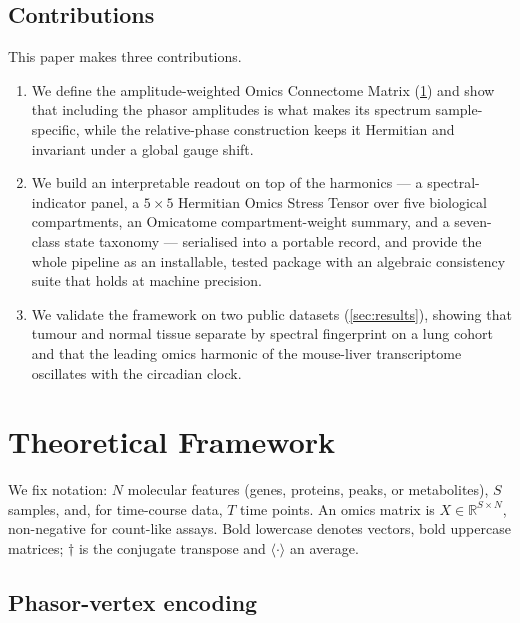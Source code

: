 \documentclass[preprint,12pt,amsmath,amssymb,superscriptaddress,floatfix]{revtex4-2}
\theoremstyle{definition}
\theoremstyle{plain}
\begin{document}
\subsection{Contributions}

This paper makes three contributions.
\begin{enumerate}[leftmargin=1.4em]
\item We define the amplitude-weighted Omics Connectome Matrix
(\cref{sec:theory}) and show that including the phasor amplitudes is what makes
its spectrum sample-specific, while the relative-phase construction keeps it
Hermitian and invariant under a global gauge shift.
\item We build an interpretable readout on top of the harmonics --- a
spectral-indicator panel, a $5\times5$ Hermitian Omics Stress Tensor over five
biological compartments, an Omicatome compartment-weight summary, and a
seven-class state taxonomy --- serialised into a portable record, and provide
the whole pipeline as an installable, tested package with an algebraic
consistency suite that holds at machine precision.
\item We validate the framework on two public datasets (\cref{sec:results}),
showing that tumour and normal tissue separate by spectral fingerprint on a lung
cohort and that the leading omics harmonic of the mouse-liver transcriptome
oscillates with the circadian clock.
\end{enumerate}

\section{Theoretical Framework}
\label{sec:theory}

We fix notation: $N$ molecular features (genes, proteins, peaks, or metabolites),
$S$ samples, and, for time-course data, $T$ time points. An omics matrix is
$X\in\mathbb{R}^{S\times N}$, non-negative for count-like assays. Bold lowercase
denotes vectors, bold uppercase matrices; $\dagger$ is the conjugate transpose
and $\langle\cdot\rangle$ an average.

\subsection{Phasor-vertex encoding}
\label{sec:theory-phasor}
\end{document}
